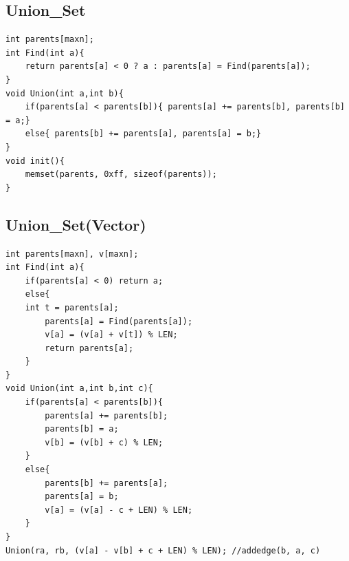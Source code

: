 \documentclass[a4paper]{article}
\begin{document}
\begin{CJK*}{UTF8}{gbsn}
\begin{multicols}{3}
\begin{flushleft}
\subsection{Union\_Set}
\begin{lstlisting}
int parents[maxn];
int Find(int a){
    return parents[a] < 0 ? a : parents[a] = Find(parents[a]);
}
void Union(int a,int b){
    if(parents[a] < parents[b]){ parents[a] += parents[b], parents[b] = a;}
    else{ parents[b] += parents[a], parents[a] = b;}
}
void init(){
    memset(parents, 0xff, sizeof(parents));
}
\end{lstlisting}


\subsection{Union\_Set(Vector)}
\begin{lstlisting}
int parents[maxn], v[maxn];
int Find(int a){
    if(parents[a] < 0) return a;
    else{
	int t = parents[a];
        parents[a] = Find(parents[a]);
        v[a] = (v[a] + v[t]) % LEN;
        return parents[a];
    }
}
void Union(int a,int b,int c){
    if(parents[a] < parents[b]){
        parents[a] += parents[b];
        parents[b] = a;
        v[b] = (v[b] + c) % LEN;
    }
    else{
        parents[b] += parents[a];
        parents[a] = b;
        v[a] = (v[a] - c + LEN) % LEN;
    }
}
Union(ra, rb, (v[a] - v[b] + c + LEN) % LEN); //addedge(b, a, c)
\end{lstlisting}



\end{flushleft}
\end{multicols}
\end{CJK*}
\end{document}
